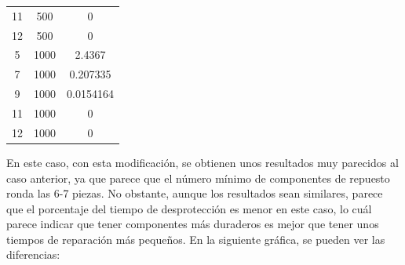 \documentclass[11pt,a4paper]{report}
\begin{document}
\begin{table}[H]
\begin{tabular}{c|c|c}
11                                                                       & 500                         & 0                                                                                          \\
12                                                                       & 500                         & 0                                                                                          \\ \hline
5                                                                        & 1000                        & 2.4367                                                                                     \\
7                                                                        & 1000                        & 0.207335                                                                                   \\
9                                                                        & 1000                        & 0.0154164                                                                                  \\
11                                                                       & 1000                        & 0                                                                                          \\
12                                                                       & 1000                        & 0                                                                                         
\end{tabular}
\end{table}

En este caso, con esta modificación, se obtienen unos resultados muy parecidos al caso anterior, ya que parece que el
número mínimo de componentes de repuesto ronda las 6-7 piezas. No obstante, aunque los resultados sean similares, parece
que el porcentaje del tiempo de desprotección es menor en este caso, lo cuál parece indicar que tener componentes más
duraderos es mejor que tener unos tiempos de reparación más pequeños. En la siguiente gráfica, se pueden ver
las diferencias:
\end{document}
